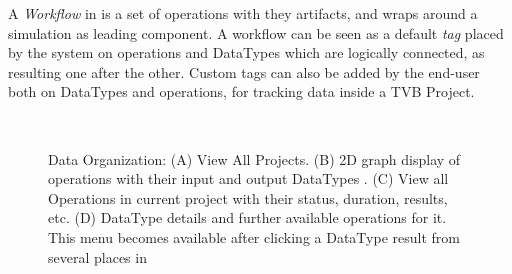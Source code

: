 A \emph{Workflow} in \TVB is a set of operations with they artifacts, and wraps around a simulation as leading component.
A workflow can be seen as a default \emph{tag} placed by the system on operations and DataTypes 
which are logically connected, as resulting one after the other.
Custom tags can also be added by the end-user both on DataTypes and operations, for tracking data inside a TVB Project.
	
 \begin{figure}
 	\centering
	\qquad
	\\
	\qquad
	\caption{\TVB Data Organization: 
	(A) View All Projects.
	(B) 2D graph display of operations with their input and output DataTypes .
	(C) View all Operations in current project with their status, duration, results, etc.
	(D) DataType details and further available operations for it. This menu becomes available after clicking a DataType result from several places in \TVB }
        \label{fig:project}
\end{figure}


